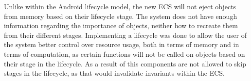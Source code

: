 Unlike within the Android lifecycle model, the new ECS will not eject objects from memory based on their lifecycle stage\cite[Activity state and ejection from memory]{android_activity_lifecycle}.
The system does not have enough information regarding the importance of objects, neither how to recreate them from their different stages.
Implementing a lifecycle was done to allow the user of the system better control over resource usage, both in terms of memory
and in terms of computation, as certain functions will not be called on objects based on their stage in the lifecycle.
As a result of this components are not allowed to skip stages in the lifecycle, as that would invalidate invariants within the ECS.
